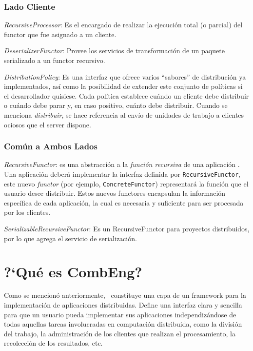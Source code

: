           \subsubsection{Lado Cliente}
					\begin{description}
						\item \textit{RecursiveProcessor}: Es el encargado de realizar la ejecuci\'on total (o parcial) del functor que fue asignado a un cliente.
						\item \textit{DeserializerFunctor}:	Provee los servicios de transformaci\'on de un paquete serializado a un functor recursivo.
            \item \textit{DistributionPolicy}: Es una interfaz que ofrece varios ``sabores'' de distribuci\'on ya implementados, as\'i como la posibilidad de
              extender este conjunto de pol\'iticas si el desarrollador quisiese. Cada pol\'itica establece cu\'ando un cliente debe distribuir o
              cu\'ando debe parar y, en caso positivo, cu\'anto debe distribuir. Cuando se menciona \textit{distribuir}, se hace referencia al env\'io 
              de unidades de trabajo a clientes ociosos que el server dispone.
					\end{description}

          \subsubsection{Com\'un a Ambos Lados}
					\begin{description}
            \item \textit{RecursiveFunctor}\label{recursiveFunctor}: es una abstracci\'on a la \textit{funci\'on recursiva} de una aplicaci\'on \recabs.
              Una aplicaci\'on deber\'a implementar la interfaz definida por \texttt{RecursiveFunctor}, este nuevo \textit{functor} (por ejemplo, 
              \texttt{ConcreteFunctor}) representar\'a la funci\'on que el usuario desee distribuir. Estos nuevos functores encapsulan la informaci\'on 
              espec\'ifica de cada aplicaci\'on, la cual es necesaria y suficiente para ser procesada por los clientes.
						\item \textit{SerializableRecursiveFunctor}: Es un RecursiveFunctor para proyectos distribuidos, por lo que agrega el servicio de 
						serializaci\'on.
					\end{description}
		
    \section{?`Qu\'e es CombEng?}
    	Como se mencion\'o anteriormente, \combeng \ constituye una capa de un framework para la implementaci\'on de aplicaciones distribuidas. Define una 
    	interfaz clara y sencilla para que un usuario pueda implementar sus aplicaciones independiz\'andose de todas aquellas tareas involucradas en computaci\'on 
    	distribuida, como la divisi\'on del trabajo, la administraci\'on de los clientes que realizan el procesamiento, la recolecci\'on de los resultados, etc.
        
